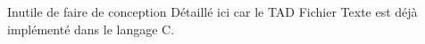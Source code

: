 Inutile de faire de conception Détaillé ici car le TAD Fichier Texte est déjà implémenté dans le langage C.